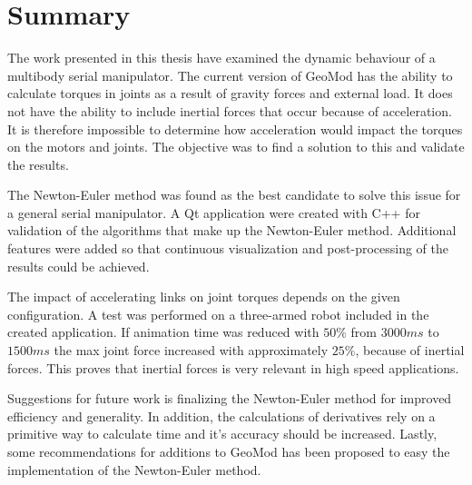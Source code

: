 \chapter*{\Huge Summary}

\noindent The work presented in this thesis have examined the dynamic behaviour of a multibody serial manipulator. The current version of GeoMod has the ability to calculate torques in joints as a result of gravity forces and external load. It does not have the ability to include inertial forces that occur because of acceleration. It is therefore impossible to determine how acceleration would impact the torques on the motors and joints. The objective was to find a solution to this and validate the results.

The Newton-Euler method was found as the best candidate to solve this issue for a general serial manipulator. A Qt application were created with C++ for validation of the algorithms that make up the Newton-Euler method. Additional features were added so that continuous visualization and post-processing of the results could be achieved.

The impact of accelerating links on joint torques depends on the given configuration. A test was performed on a three-armed robot included in the created application. If animation time was reduced with $50\%$ from $3000ms$ to $1500ms$ the max joint force increased with approximately $25\%$, because of inertial forces. This proves that inertial forces is very relevant in high speed applications.

Suggestions for future work is finalizing the Newton-Euler method for improved efficiency and generality. In addition, the calculations of derivatives rely on a primitive way to calculate time and it's accuracy should be increased. Lastly, some recommendations for additions to GeoMod has been proposed to easy the implementation of the Newton-Euler method.